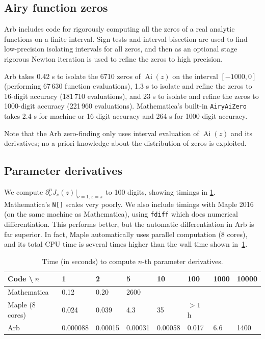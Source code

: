 \documentclass[review,nohypdvips]{siamart0216}
\begin{document}
\subsection{Airy function zeros}

Arb includes code for rigorously computing
all the zeros of a real analytic functions on a finite interval.
Sign tests and interval bisection are used
to find low-precision isolating intervals for all zeros,
and then as an optional stage rigorous Newton iteration
is used to refine the zeros to high precision.

Arb takes 0.42 s to isolate the 6710 zeros of
$\operatorname{Ai}(z)$ on the interval $[-1000,0]$
(performing 67\,630 function evaluations),
1.3 s to isolate and refine the zeros to 16-digit accuracy (181\,710 evaluations),
and 23 s to isolate and refine the zeros to 1000-digit accuracy
(221\,960 evaluations).
Mathematica's built-in \texttt{AiryAiZero} takes 2.4 s for
machine or 16-digit accuracy and 264 s for 1000-digit accuracy.

Note that the Arb zero-finding only uses interval evaluation
of $\operatorname{Ai}(z)$ and its derivatives; 
no a priori knowledge about the distribution of zeros
is exploited.

\subsection{Parameter derivatives}

We compute $\partial_{\nu}^n J_{\nu}(z) \vert_{\nu=1,z=\pi}$ to 100 digits,
showing timings in \cref{tab:paramderiv}.
Mathematica's \texttt{N[]} scales very poorly.
We also include timings with Maple 2016 (on the same machine as Mathematica),
using \texttt{fdiff} which does numerical differentiation.
This performs better, but the automatic
differentiation in Arb is far superior.
In fact, Maple automatically uses parallel computation (8 cores), and its total CPU
time is several times higher than the wall time shown in~\cref{tab:paramderiv}.

\begin{table}[h!]
\renewcommand{\arraystretch}{1.1}
\setlength{\tabcolsep}{.4em}
\begin{center}
\caption{Time (in seconds) to compute $n$-th parameter derivatives.}
\begin{small}
\begin{tabular}{l | l l l l l l l}
Code \textbackslash $\;n$      & 1 & 2 & 5 & 10 & 100 & 1000 & 10000  \\ \hline
Mathematica     & 0.12     & 0.20    & 2600    &         &       &     &        \\
Maple (8 cores) & 0.024    & 0.039   & 4.3     & 35       & $>1$ h    &     &        \\
Arb             & 0.000088 & 0.00015 & 0.00031 & 0.00058 & 0.017 & 6.6 & 1400
\end{tabular}
\end{small}
\label{tab:paramderiv}
\end{center}
\end{table}
\end{document}

